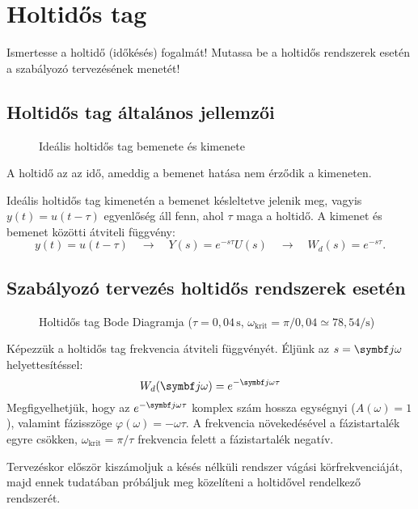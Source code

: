 \section{Holtidős tag}

\begin{about}
  Ismertesse a holtidő (időkésés) fogalmát! Mutassa be a holtidős rendszerek
  esetén a szabályozó tervezésének menetét!
\end{about}

\subsection{Holtidős tag általános jellemzői}

\begin{figure}[htb]
  \centering
  
  \caption{Ideális holtidős tag bemenete és kimenete}
  \label{fig:delay}
\end{figure}

A holtidő az az idő, ameddig a bemenet hatása nem érződik a kimeneten.

Ideális holtidős tag kimenetén a bemenet késleltetve jelenik meg, vagyis
$y(t) = u(t - \tau)$ egyenlőség áll fenn, ahol $\tau$ maga a holtidő. A kimenet
és bemenet közötti átviteli függvény:
\begin{equation}
  y(t) = u(t - \tau)
  \quad \rightarrow \quad
  Y(s) = e^{-s \tau} U(s)
  \quad \rightarrow \quad
  W_d(s) = e^{-s \tau}
  .
  \label{eq:delay-W}
\end{equation}

\subsection{Szabályozó tervezés holtidős rendszerek esetén}

\begin{figure}[htb]
  \centering
  \hspace{-4cm}
  
  \caption{
    Holtidős tag Bode Diagramja
    ($\tau=0,04 \, \mathrm s$,
    $\omega_\text{krit} = \pi / 0,04 \simeq 78,54 / \mathrm s$)
  }
  \label{fig:delay-bode}
\end{figure}

Képezzük a holtidős tag frekvencia átviteli függvényét. Éljünk az
$s = \iu \omega$ helyettesítéssel:
\begin{equation}
  W_d(\iu\omega) = e^{-\iu\omega\tau}
  \label{eq:delay-iuw}
\end{equation}
Megfigyelhetjük, hogy az $e^{-\iu\omega\tau}$ komplex szám hossza egységnyi
($A(\omega) = 1$), valamint fázisszöge $\varphi(\omega) = -\omega\tau$.
A frekvencia növekedésével a fázistartalék egyre csökken, $\omega_\text{krit} =
  \pi / \tau$ frekvencia felett a fázistartalék negatív.

Tervezéskor először kiszámoljuk a késés nélküli rendszer vágási
körfrekvenciáját, majd ennek tudatában próbáljuk meg közelíteni a holtidővel
rendelkező rendszerét.
